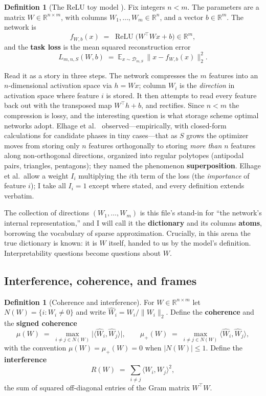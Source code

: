 \documentclass[11pt]{amsart}
\theoremstyle{plain}
\theoremstyle{definition}
\newtheorem{definition}[theorem]{Definition}
\DeclareMathOperator{\relu}{ReLU}
\newcommand{\E}{\mathbb{E}}
\newcommand{\R}{\mathbb{R}}
\begin{document}
\begin{definition}[The ReLU toy model \cite{elhage2022}]\label{def:toy}
Fix integers $n<m$. The parameters are a matrix $W\in\R^{n\times m}$, with columns $W_1,\dots,W_m\in\R^n$, and a vector $b\in\R^m$. The network is
\[
f_{W,b}(x) \;=\; \relu\bigl(W^{\top}Wx+b\bigr)\in\R^m ,
\]
and the \textbf{task loss} is the mean squared reconstruction error
\[
L_{m,n,S}(W,b) \;=\; \E_{x\sim\mathcal D_{m,S}}\,\bigl\|x-f_{W,b}(x)\bigr\|_2^2 .
\]
\end{definition}

Read it as a story in three steps. The network compresses the $m$ features into an $n$-dimensional activation space via $h=Wx$; column $W_i$ is the \emph{direction} in activation space where feature $i$ is stored. It then attempts to read every feature back out with the transposed map $W^{\top}h+b$, and rectifies. Since $n<m$ the compression is lossy, and the interesting question is what storage scheme optimal networks adopt. Elhage et al.~\cite{elhage2022} observed---empirically, with closed-form calculations for candidate phases in tiny cases---that as $S$ grows the optimizer moves from storing only $n$ features orthogonally to storing \emph{more than $n$} features along non-orthogonal directions, organized into regular polytopes (antipodal pairs, triangles, pentagons); they named the phenomenon \textbf{superposition}. Elhage et al.\ allow a weight $I_i$ multiplying the $i$th term of the loss (the \emph{importance} of feature $i$); I take all $I_i=1$ except where stated, and every definition extends verbatim.

The collection of directions $(W_1,\dots,W_m)$ is this file's stand-in for ``the network's internal representation,'' and I will call it the \textbf{dictionary} and its columns \textbf{atoms}, borrowing the vocabulary of sparse approximation. Crucially, in this arena the true dictionary is known: it is $W$ itself, handed to us by the model's definition. Interpretability questions become questions about $W$.

\subsection{Interference, coherence, and frames}

\begin{definition}[Coherence and interference]\label{def:coherence}
For $W\in\R^{n\times m}$ let $N(W)=\{i: W_i\neq 0\}$ and write $\widehat W_i = W_i/\|W_i\|_2$. Define the \textbf{coherence} and the \textbf{signed coherence}
\[
\mu(W) \;=\; \max_{i\neq j\in N(W)} \bigl|\langle \widehat W_i,\widehat W_j\rangle\bigr|,
\qquad
\mu_+(W) \;=\; \max_{i\neq j\in N(W)} \langle \widehat W_i,\widehat W_j\rangle ,
\]
with the convention $\mu(W)=\mu_+(W)=0$ when $|N(W)|\le 1$. Define the \textbf{interference}
\[
R(W) \;=\; \sum_{i\neq j} \langle W_i,W_j\rangle^2 ,
\]
the sum of squared off-diagonal entries of the Gram matrix $W^{\top}W$.
\end{definition}
\end{document}
